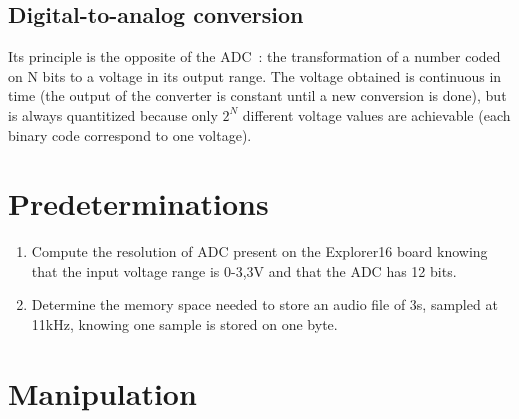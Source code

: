 \documentclass[11pt,a4paper]{article}
\theoremstyle{definition}%
\begin{document}
\subsection{Digital-to-analog conversion}
Its principle is the opposite of the ADC~: the transformation of a number coded on N bits to a voltage in its output range.
The voltage obtained is continuous in time (the output of the converter is constant until a new conversion is done), but is always quantitized because only $2^N$ different voltage values are achievable (each binary code correspond to one voltage).



\section{Predeterminations}\label{sec:predet}
\begin{enumerate}
	\item Compute the resolution of ADC present on the Explorer16 board knowing that the input voltage range is 0-3,3V and that the ADC has 12 bits.
	\item Determine the memory space needed to store an audio file of 3s, sampled at 11kHz, knowing one sample is stored on one byte.
\end{enumerate}



\section{Manipulation}
\end{document}
